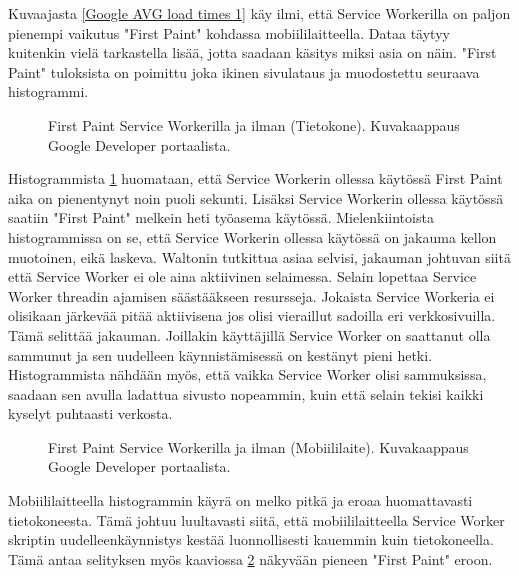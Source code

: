 \documentclass{tktltiki}
\begin{document}
Kuvaajasta \ref{Google AVG load times 1} käy ilmi, että Service Workerilla on paljon pienempi vaikutus "First Paint" kohdassa mobiililaitteella. Dataa täytyy kuitenkin vielä tarkastella lisää, jotta saadaan käsitys miksi asia on näin. "First Paint" tuloksista on poimittu joka ikinen sivulataus ja muodostettu seuraava histogrammi.

\begin{figure}[h]
\begin{center}
\caption{First Paint Service Workerilla ja ilman (Tietokone). Kuvakaappaus Google Developer portaalista.}
\label{Google AVG load times 2}
\end{center}
\end{figure}

Histogrammista \ref{Google AVG load times 2} huomataan, että Service Workerin ollessa käytössä First Paint aika on pienentynyt noin puoli sekunti. Lisäksi Service Workerin ollessa käytössä saatiin "First Paint" melkein heti työasema käytössä. Mielenkiintoista histogrammissa on se, että Service Workerin ollessa käytössä on jakauma kellon muotoinen, eikä laskeva. Waltonin tutkittua asiaa selvisi, jakauman johtuvan siitä että Service Worker ei ole aina aktiivinen selaimessa. Selain lopettaa Service Worker threadin ajamisen säästääkseen resursseja. Jokaista Service Workeria ei olisikaan järkevää pitää aktiivisena jos olisi vieraillut sadoilla eri verkkosivuilla. Tämä selittää jakauman. Joillakin käyttäjillä Service Worker on saattanut olla sammunut ja sen uudelleen käynnistämisessä on kestänyt pieni hetki. Histogrammista nähdään myös, että vaikka Service Worker olisi sammuksissa, saadaan sen avulla ladattua sivusto nopeammin, kuin että selain tekisi kaikki kyselyt puhtaasti verkosta. 

\clearpage

\begin{figure}[h]
\begin{center}
\caption{First Paint Service Workerilla ja ilman (Mobiililaite). Kuvakaappaus Google Developer portaalista.}
\label{Google AVG load times 3}
\end{center}
\end{figure}

Mobiililaitteella histogrammin käyrä on melko pitkä ja eroaa huomattavasti tietokoneesta. Tämä johtuu luultavasti siitä, että mobiililaitteella Service Worker skriptin uudelleenkäynnistys kestää luonnollisesti kauemmin kuin tietokoneella. Tämä antaa selityksen myös kaaviossa \ref{Google AVG load times 3} näkyvään pieneen "First Paint" eroon. 
\end{document}
